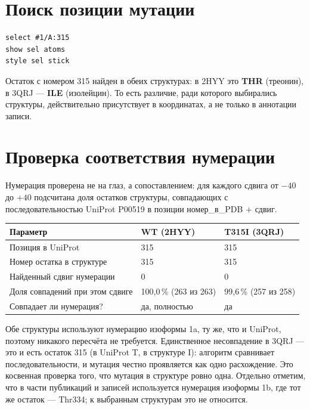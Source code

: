 \documentclass[12pt,a4paper]{article}
\newcommand{\code}[1]{{\ttfamily #1}}
\begin{document}
\section{Поиск позиции мутации}

\begin{verbatim}
select #1/A:315
show sel atoms
style sel stick
\end{verbatim}

\noindent Остаток с номером 315 найден в обеих структурах: в 2HYY это \textbf{THR}
(треонин), в 3QRJ --- \textbf{ILE} (изолейцин). То есть различие, ради которого
выбирались структуры, действительно присутствует в координатах, а не только в
аннотации записи.

\section{Проверка соответствия нумерации}

Нумерация проверена не на глаз, а сопоставлением: для каждого сдвига от $-40$ до $+40$
подсчитана доля остатков структуры, совпадающих с последовательностью UniProt
\code{P00519} в позиции \code{номер\_в\_PDB} $+$ \code{сдвиг}.

\begin{center}
\begin{tabular}{L{5.0cm}L{4.8cm}L{4.8cm}}
\toprule
\textbf{Параметр} & \textbf{WT (2HYY)} & \textbf{T315I (3QRJ)} \\
\midrule
Позиция в UniProt & 315 & 315 \\
Номер остатка в структуре & 315 & 315 \\
Найденный сдвиг нумерации & $0$ & $0$ \\
Доля совпадений при этом сдвиге & 100{,}0\,\% (263 из 263) & 99{,}6\,\% (257 из 258) \\
Совпадает ли нумерация? & да, полностью & да \\
\bottomrule
\end{tabular}
\end{center}

\noindent Обе структуры используют нумерацию изоформы 1a, ту же, что и UniProt, поэтому
никакого пересчёта не требуется. Единственное несовпадение в 3QRJ --- это и есть остаток
315 (в UniProt \code{T}, в структуре \code{I}): алгоритм сравнивает последовательности,
и мутация честно проявляется как одно расхождение. Это косвенная проверка того, что
мутация в структуре ровно одна. Отдельно отметим, что в части публикаций и записей
используется нумерация изоформы 1b, где тот же остаток --- Thr334; к выбранным
структурам это не относится.
\end{document}
